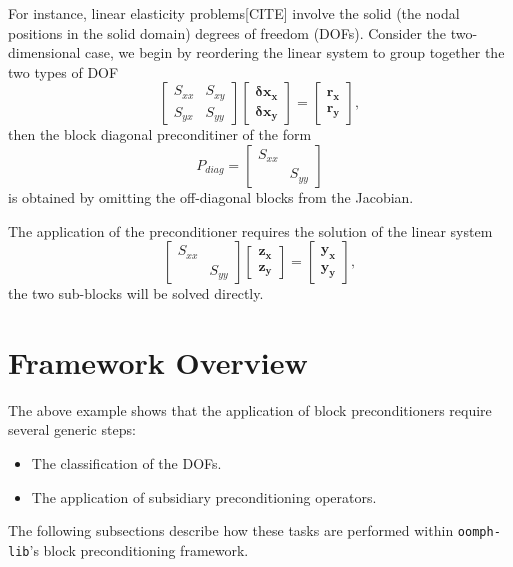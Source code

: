For instance, linear elasticity problems[CITE] involve the solid (the nodal positions in the solid domain) degrees of freedom (DOFs). Consider the two-dimensional case, we begin by reordering the linear system to group together the two types of DOF 
\begin{equation*}
\begin{bmatrix}
 S_{xx} & S_{xy} \\
 S_{yx} & S_{yy}
\end{bmatrix}
\begin{bmatrix}
 \mathbf{\delta x_x} \\
 \mathbf{\delta x_y} 
\end{bmatrix}
=
\begin{bmatrix}
 \mathbf{r_x} \\
 \mathbf{r_y}
\end{bmatrix},
\end{equation*}
then the block diagonal preconditiner of the form 
\begin{equation*}
P_{diag}=
\begin{bmatrix}
S_{xx}&     \\
      &S_{yy}
\end{bmatrix}
\end{equation*}
is obtained by omitting the off-diagonal blocks from the Jacobian.

The application of the preconditioner requires the solution of the linear system
\begin{equation*}
\begin{bmatrix}
S_{xx}& \\
      &S_{yy}
\end{bmatrix}
\begin{bmatrix}
\mathbf{z_x}\\
\mathbf{z_y}
\end{bmatrix}
=
\begin{bmatrix}
\mathbf{y_x}\\
\mathbf{y_y}
\end{bmatrix},
\end{equation*}
the two sub-blocks will be solved directly.

\section{ Framework Overview\label{sec:framework_overview}}
The above example shows that the application of block preconditioners
require several generic steps:
\begin{itemize}
\item The classification of the DOFs.
\item The application of subsidiary preconditioning operators.
\end{itemize}
The following subsections describe how these tasks are performed
within \verb+oomph-lib+'s block preconditioning framework.

